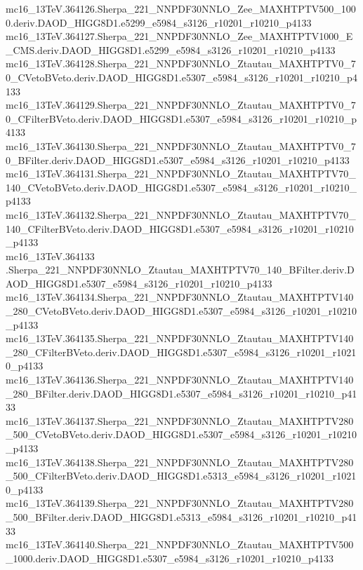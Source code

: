mc16_13TeV.364126.Sherpa_221_NNPDF30NNLO_Zee_MAXHTPTV500_1000.deriv.DAOD_HIGG8D1.e5299_e5984_s3126_r10201_r10210_p4133 \\
mc16_13TeV.364127.Sherpa_221_NNPDF30NNLO_Zee_MAXHTPTV1000_E_CMS.deriv.DAOD_HIGG8D1.e5299_e5984_s3126_r10201_r10210_p4133 \\
mc16_13TeV.364128.Sherpa_221_NNPDF30NNLO_Ztautau_MAXHTPTV0_70_CVetoBVeto.deriv.DAOD_HIGG8D1.e5307_e5984_s3126_r10201_r10210_p4133 \\
mc16_13TeV.364129.Sherpa_221_NNPDF30NNLO_Ztautau_MAXHTPTV0_70_CFilterBVeto.deriv.DAOD_HIGG8D1.e5307_e5984_s3126_r10201_r10210_p4133 \\
mc16_13TeV.364130.Sherpa_221_NNPDF30NNLO_Ztautau_MAXHTPTV0_70_BFilter.deriv.DAOD_HIGG8D1.e5307_e5984_s3126_r10201_r10210_p4133 \\
mc16_13TeV.364131.Sherpa_221_NNPDF30NNLO_Ztautau_MAXHTPTV70_140_CVetoBVeto.deriv.DAOD_HIGG8D1.e5307_e5984_s3126_r10201_r10210_p4133 \\
mc16_13TeV.364132.Sherpa_221_NNPDF30NNLO_Ztautau_MAXHTPTV70_140_CFilterBVeto.deriv.DAOD_HIGG8D1.e5307_e5984_s3126_r10201_r10210_p4133 \\
mc16_13TeV.364133 \\.Sherpa_221_NNPDF30NNLO_Ztautau_MAXHTPTV70_140_BFilter.deriv.DAOD_HIGG8D1.e5307_e5984_s3126_r10201_r10210_p4133 \\
mc16_13TeV.364134.Sherpa_221_NNPDF30NNLO_Ztautau_MAXHTPTV140_280_CVetoBVeto.deriv.DAOD_HIGG8D1.e5307_e5984_s3126_r10201_r10210_p4133 \\
mc16_13TeV.364135.Sherpa_221_NNPDF30NNLO_Ztautau_MAXHTPTV140_280_CFilterBVeto.deriv.DAOD_HIGG8D1.e5307_e5984_s3126_r10201_r10210_p4133 \\
mc16_13TeV.364136.Sherpa_221_NNPDF30NNLO_Ztautau_MAXHTPTV140_280_BFilter.deriv.DAOD_HIGG8D1.e5307_e5984_s3126_r10201_r10210_p4133 \\
mc16_13TeV.364137.Sherpa_221_NNPDF30NNLO_Ztautau_MAXHTPTV280_500_CVetoBVeto.deriv.DAOD_HIGG8D1.e5307_e5984_s3126_r10201_r10210_p4133 \\
mc16_13TeV.364138.Sherpa_221_NNPDF30NNLO_Ztautau_MAXHTPTV280_500_CFilterBVeto.deriv.DAOD_HIGG8D1.e5313_e5984_s3126_r10201_r10210_p4133 \\
mc16_13TeV.364139.Sherpa_221_NNPDF30NNLO_Ztautau_MAXHTPTV280_500_BFilter.deriv.DAOD_HIGG8D1.e5313_e5984_s3126_r10201_r10210_p4133 \\
mc16_13TeV.364140.Sherpa_221_NNPDF30NNLO_Ztautau_MAXHTPTV500_1000.deriv.DAOD_HIGG8D1.e5307_e5984_s3126_r10201_r10210_p4133 \\
